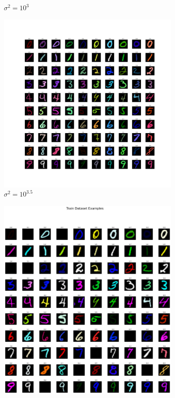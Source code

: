 \begin{figure}[H]
\begin{subfigure}[b]{0.48\textwidth}
        \caption{$\sigma^2 = 10^3$}
        \label{fig:coloredeminst_1000}
    \end{subfigure}
    \vspace{0.5cm}
    \begin{subfigure}[b]{0.48\textwidth}
        \centering
        \includegraphics[width=\textwidth]{fig/coloredemnist_3612.pdf}
        \caption{$\sigma^2 = 10^{3.5}$}
        \label{fig:coloredeminst_3612}
    \end{subfigure}
    \hfill
    \begin{subfigure}[b]{0.48\textwidth}
        \centering
        \includegraphics[width=\textwidth]{fig/coloredemnist_10000.pdf}

\end{subfigure}
\end{figure}
